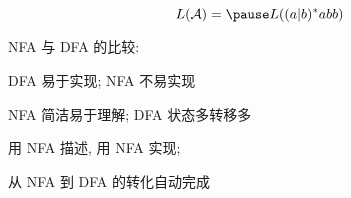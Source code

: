 \begin{frame}{}

  \[
    L(\mathcal{A}) = \pause L((a|b)^{\ast}abb)
  \]

  \pause
\end{frame}

\begin{frame}{}
  \begin{center}
    NFA 与 DFA 的比较:

    \vspace{0.80cm}
    DFA 易于实现; NFA 不易实现

    \vspace{0.30cm}
    NFA 简洁易于理解; DFA 状态多转移多

    \vspace{0.80cm}

    \vspace{0.30cm}
    用 NFA 描述, 用 NFA 实现; 

    \vspace{0.30cm}
    从 NFA 到 DFA 的转化自动完成
  \end{center}
\end{frame}

\begin{frame}{}
\end{frame}

